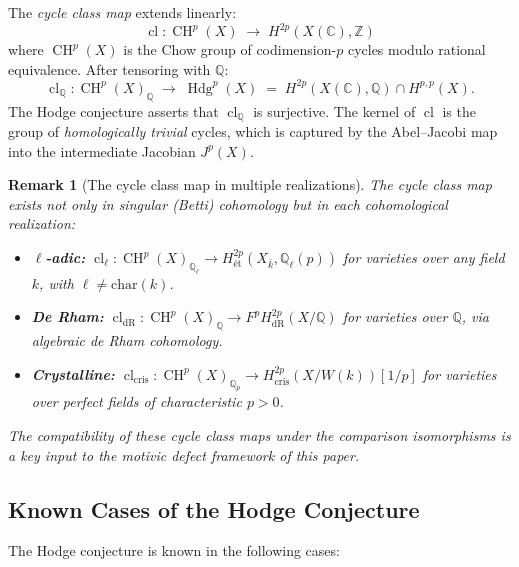 \documentclass[11pt]{article}
\newtheorem{remark}[theorem]{Remark}
\theoremstyle{definition}
\DeclareMathOperator{\cl}{cl}
\DeclareMathOperator{\CH}{CH}
\DeclareMathOperator{\Hdg}{Hdg}
\begin{document}
The \emph{cycle class map} extends linearly:
\[
  \cl : \CH^p(X) \;\longrightarrow\; H^{2p}(X(\mathbb{C}), \mathbb{Z})
\]
where $\CH^p(X)$ is the Chow group of codimension-$p$ cycles modulo
rational equivalence.  After tensoring with $\mathbb{Q}$:
\[
  \cl_{\mathbb{Q}} : \CH^p(X)_{\mathbb{Q}}
  \;\longrightarrow\;
  \Hdg^p(X)
  \;=\;
  H^{2p}(X(\mathbb{C}), \mathbb{Q}) \cap H^{p,p}(X).
\]
The Hodge conjecture asserts that $\cl_{\mathbb{Q}}$ is surjective.  The
kernel of $\cl$ is the group of \emph{homologically trivial} cycles, which
is captured by the Abel--Jacobi map into the intermediate Jacobian
$J^p(X)$.

\begin{remark}[The cycle class map in multiple realizations]
The cycle class map exists not only in singular (Betti) cohomology but
in each cohomological realization:
\begin{itemize}
  \item \textbf{$\ell$-adic:}
    $\cl_\ell : \CH^p(X)_{\mathbb{Q}_\ell} \to
    H^{2p}_{\text{\'et}}(X_{\bar{k}}, \mathbb{Q}_\ell(p))$ for varieties
    over any field $k$, with $\ell \neq \mathrm{char}(k)$.
  \item \textbf{De Rham:}
    $\cl_{\mathrm{dR}} : \CH^p(X)_{\mathbb{Q}} \to
    F^p H^{2p}_{\mathrm{dR}}(X/\mathbb{Q})$ for varieties over $\mathbb{Q}$,
    via algebraic de Rham cohomology.
  \item \textbf{Crystalline:}
    $\cl_{\mathrm{cris}} : \CH^p(X)_{\mathbb{Q}_p} \to
    H^{2p}_{\mathrm{cris}}(X/W(k))[1/p]$ for varieties over perfect fields
    of characteristic $p > 0$.
\end{itemize}
The compatibility of these cycle class maps under the comparison isomorphisms
is a key input to the motivic defect framework of this paper.
\end{remark}

\subsection{Known Cases of the Hodge Conjecture}
\label{sec:known-cases}

The Hodge conjecture is known in the following cases:
\end{document}
